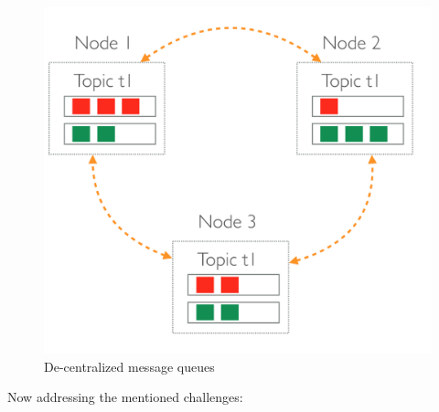\begin{figure}[H]
	\centering
	\includegraphics[scale=0.3]{images/de-message-queues.png}
	\caption{De-centralized message queues}
	\label{fig:de-message-queues}
\end{figure}
 Now addressing the mentioned challenges:

